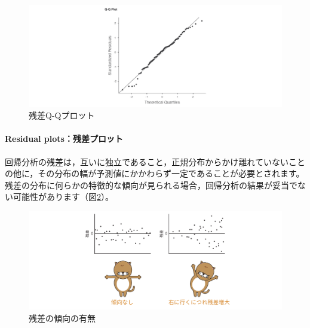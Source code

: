 \documentclass[
  12pt,
  a5jpaper,
  lualatex, ja=standard]{bxjsbook}
\begin{document}
\begin{figure}[!ht]

{\centering \includegraphics[width=1\linewidth]{images/regression/lr-assumption-qq} 

}

\caption{残差Q-Qプロット}\label{fig:regression-lr-assumption-qq}
\end{figure}

\hypertarget{residual-plotsux6b8bux5deeux30d7ux30edux30c3ux30c8}{%
\paragraph*{Residual plots：残差プロット}\label{residual-plotsux6b8bux5deeux30d7ux30edux30c3ux30c8}}

回帰分析の残差は，互いに独立であること，正規分布からかけ離れていないことの他に，その分布の幅が予測値にかかわらず一定であることが必要とされます。残差の分布に何らかの特徴的な傾向が見られる場合，回帰分析の結果が妥当でない可能性があります（図\ref{fig:regression-lr-assumption-residual}）。

\begin{figure}[!ht]

{\centering \includegraphics[width=1\linewidth]{images/regression/lr-assumption-residual} 

}

\caption{残差の傾向の有無}\label{fig:regression-lr-assumption-residual}
\end{figure}
\end{document}
